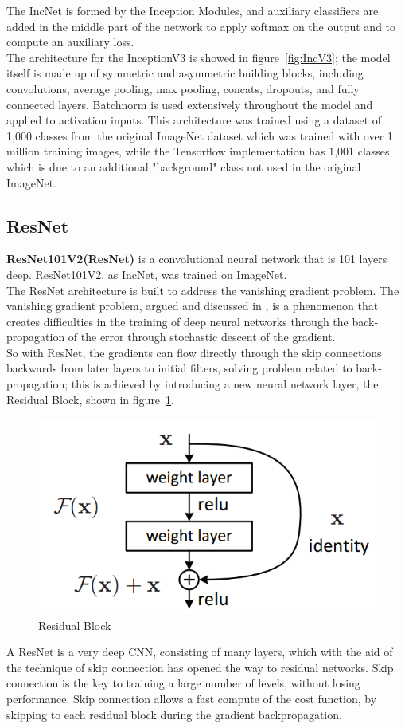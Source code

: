 The IncNet is formed by the Inception Modules, and auxiliary classifiers are added in the middle part of the network to apply softmax on the output and to compute an auxiliary loss.\\
The architecture for the InceptionV3 is showed in figure~\ref{fig:IncV3}; the model itself is made up of symmetric and asymmetric building blocks, including convolutions, average pooling, max pooling, concats, dropouts, and fully connected layers. Batchnorm is used extensively throughout the model and applied to activation inputs.
This architecture was trained using a dataset of 1,000 classes from the original ImageNet dataset which was trained with over 1 million training images, while the Tensorflow implementation has 1,001 classes which is due to an additional "background" class not used in the original ImageNet.

\subsection{ResNet}
\textbf{ResNet101V2(ResNet)} is a convolutional neural network that is 101 layers deep. ResNet101V2, as IncNet, was trained on ImageNet.\\
The ResNet architecture is built to address the vanishing gradient problem.
The vanishing gradient problem, argued and discussed in \cite{vanishinGradient}, is a phenomenon that creates difficulties in the training of deep neural networks through the back-propagation of the error through stochastic descent of the gradient. \\
So with ResNet, the gradients can flow directly through the skip connections backwards from later layers to initial filters, solving problem related to back-propagation; this is achieved by introducing a new neural network layer, the Residual Block, shown in figure~\ref{fig:ResBlock}. \\
\begin{figure}[]
    \centering
        \includegraphics[width=0.7\linewidth]{images/resnet/residualblock.png}
    \caption{Residual Block}
    \label{fig:ResBlock}
\end{figure}
A ResNet is a very deep CNN, consisting of many layers, which with the aid of the technique of skip connection has opened the way to residual networks. Skip connection is the key to training a large number of levels, without losing performance.
Skip connection allows a fast compute of the cost function, by skipping to each residual block during the gradient backpropagation\cite{Resnet}.
